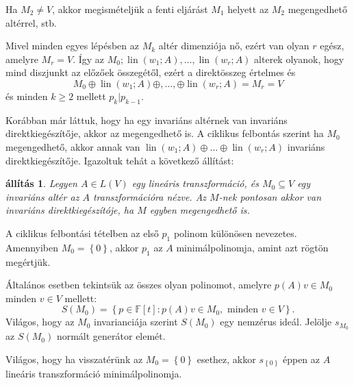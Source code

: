 \documentclass[9pt, a4paper, showtrims]{memoir}
\makeatletter
\renewenvironment{proof}[1][\proofname]
    {\par\pushQED{\qed}%
    \normalfont \topsep6\p@\@plus6\p@\relax
    \trivlist
    \item[\hskip\labelsep
        \itshape
    #1\@addpunct{:}]\ignorespaces}
    {\popQED\endtrivlist\@endpefalse}
\theoremstyle{plain}
\newtheorem{proposition}{állítás}[chapter]
\theoremstyle{remark}
\theoremstyle{definition}
\DeclareMathOperator{\lin}{lin}
\makeatother
\begin{document}
\begin{proof}
    Ha $M_2\neq V$, akkor megismételjük a fenti eljárást $M_1$ helyett az $M_2$ megengedhető altérrel, stb.

    Mivel minden egyes lépésben az $M_k$ altér dimenziója nő, ezért van olyan $r$ egész, amelyre $M_r=V$.
    Így az $M_0;\lin\left( w_1;A \right),\dots,\lin\left( w_r;A \right)$ alterek olyanok, 
    hogy mind diszjunkt az előzőek összegétől, ezért a direktösszeg értelmes és
    \[
        M_0\oplus\lin\left( w_1;A \right)\oplus,\ldots,\oplus\lin\left( w_r;A \right)=M_r=V
    \]
    és minden $k\geq 2$ mellett $p_{k}|p_{k-1}$.
\end{proof}

Korábban már láttuk, hogy ha egy invariáns altérnek van invariáns direktkiegészítője, akkor az megengedhető is.
A ciklikus felbontás szerint ha $M_0$ megengedhető, akkor annak van $\lin\left( w_1;A \right)\oplus\ldots\oplus\lin\left( w_r;A \right)$ invariáns direktkiegészítője.
Igazoltuk tehát a következő állítást:
\begin{proposition}
    Legyen $A\in L\left( V \right)$ egy lineáris transzformáció,
    és $M_0\subseteq V$ egy invariáns altér az $A$ transzformációra nézve.
    Az $M$-nek pontosan akkor van invariáns direktkiegészítóje, ha $M$ egyben megengedhető is.
\end{proposition}

A ciklikus felbontási tételben az első $p_1$ polinom különösen nevezetes. 
Amennyiben $M_0=\left\{ 0 \right\}$, akkor $p_1$ az $A$ minimálpolinomja,
amint azt rögtön megértjük.

Általános esetben tekintsük az összes olyan polinomot, amelyre $p\left( A \right)v\in M_0$ minden $v\in V$ mellett:
\[
S\left( M_0 \right)=\left\{ p\in\mathbb{F}\left[ t \right]:p\left( A \right)v\in M_0,\text{ minden } v\in V \right\}.
\]
Világos, hogy az $M_0$ invarianciája szerint $S\left( M_0 \right)$ egy nemzérus ideál.
Jelölje $s_{M_0}$ az $S\left( M_0 \right)$ normált generátor elemét.

Világos, hogy ha visszatérünk az $M_0=\left\{ 0 \right\}$ esethez,
akkor $s_{\left\{ 0 \right\}}$ éppen az $A$ lineáris transzformáció minimálpolinomja.
\end{document}
